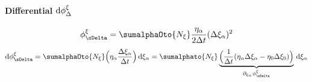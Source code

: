 \paragraph{Differential ${\rm d}\phi^{\xi}_\Delta$} \label{app:dphixi} %
\begin{align}
  \phixiDelta = \sumalphaOto{\Nxi} \frac{\etaa}{2\Delta t} (\Delta\xia)^2 
\end{align}
\begin{align}
  \rmd\phixiDelta = \sumalphaOto{\Nxi} \Big(\etaa\frac{\Delta\xia}{\Delta t}\Big)\, \rmd\xia = \sumalphato{\Nxi} \underbrace{\Big(\frac{1}{\Delta t}(\etaa \Delta\xia-\eta_0\Delta\xiO )\Big)}_{\dxia\phixiDelta} \, \rmd \xia
\end{align}

